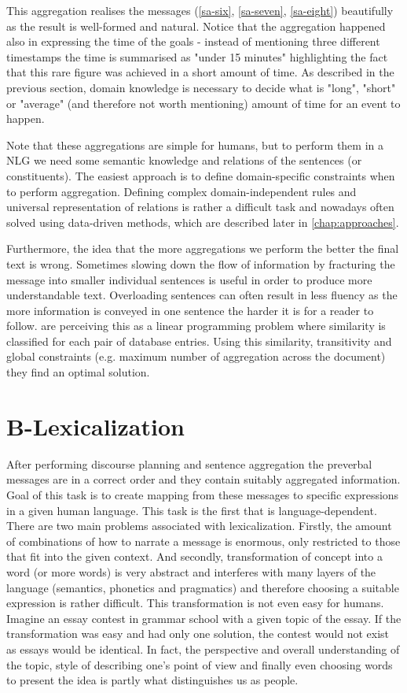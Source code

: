 This aggregation realises the messages (\ref{sa-six}, \ref{sa-seven}, \ref{sa-eight}) beautifully as the result is well-formed and natural. Notice that the aggregation happened also in expressing the time of the goals - instead of mentioning three different timestamps the time is summarised as "under 15 minutes" highlighting the fact that this rare figure was achieved in a short amount of time. As described in the previous section, domain knowledge is necessary to decide what is "long", "short" or "average" (and therefore not worth mentioning) amount of time for an event to happen.

Note that these aggregations are simple for humans, but to perform them in a NLG we need some semantic knowledge and relations of the sentences (or constituents). The easiest approach is to define domain-specific constraints when to perform aggregation. Defining complex domain-independent rules and universal representation of relations is rather a difficult task and nowadays often solved using data-driven methods, which are described later in \autoref{chap:approaches}. 

Furthermore, the idea that the more aggregations we perform the better the final text is wrong. Sometimes slowing down the flow of information by fracturing the message into smaller individual sentences is useful in order to produce more understandable text. Overloading sentences can often result in less fluency as the more information is conveyed in one sentence the harder it is for a reader to follow. \cite{barzilay2006aggregation} are perceiving this as a linear programming problem where similarity is classified for each pair of database entries. Using this similarity, transitivity and global constraints (e.g. maximum number of aggregation across the document) they find an optimal solution.   

\section{B-Lexicalization}
After performing discourse planning and sentence aggregation the preverbal messages are in a correct order and they contain suitably aggregated information. Goal of this task is to create mapping from these messages to specific expressions in a given human language. This task is the first that is language-dependent. There are two main problems associated with lexicalization. Firstly, the amount of combinations of how to narrate a message is enormous, only restricted to those that fit into the given context. And secondly, transformation of concept into a word (or more words) is very abstract and interferes with many layers of the language (semantics, phonetics and pragmatics) and therefore choosing a suitable expression is rather difficult. This transformation is not even easy for humans. Imagine an essay contest in grammar school with a given topic of the essay. If the transformation was easy and had only one solution, the contest would not exist as essays would be identical. In fact, the perspective and overall understanding of the topic, style of describing one’s point of view and finally even choosing words to present the idea is partly what distinguishes us as people. 

